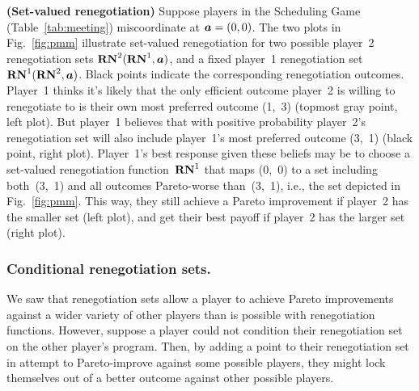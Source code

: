 \documentclass[sigconf]{aamas}
\theoremstyle{definition}
\begin{document}
\begin{exmp}
\label{ex:svr}
\textbf{(Set-valued renegotiation)}
Suppose players in 
the Scheduling Game (Table~\ref{tab:meeting})
miscoordinate at $\boldsymbol{a}= (0,0)$.
The two plots in Fig.~\ref{fig:pmm} 
illustrate set-valued renegotiation
for
two possible player~2 renegotiation
sets
$\mathbf{RN}^{2}(\mathbf{RN}^{1}, \boldsymbol{a})$,
and a fixed player~1
renegotiation
set
$\mathbf{RN}^{1}(\mathbf{RN}^{2}, \boldsymbol{a})$.
Black points indicate the corresponding renegotiation
outcomes.
Player~1 thinks it's likely that
the only efficient outcome
player~2 is willing to renegotiate to 
is their own most
preferred outcome (1,~3)
(topmost gray point, left
plot).
But player~1 believes
that
with positive probability
player~2's renegotiation set 
will also
include
player~1's most preferred outcome (3,~1)
(black point, right plot).
Player~1's best response given these
beliefs may be to choose a 
set-valued
renegotiation function~$\mathbf{RN}^{1}$
that
maps (0,~0)
to a set
including both~(3,~1) and all outcomes
Pareto-worse
than~(3,~1),
i.e., the set depicted in Fig.~\ref{fig:pmm}.
This way, they
still achieve a Pareto improvement
if
player~2 has the smaller set (left plot),
and get their best payoff
if player~2 has the larger set (right plot).
\end{exmp}

\subsubsection{Conditional renegotiation sets.}
We saw that renegotiation sets allow a player to achieve 
Pareto improvements against a wider variety
of other players than is possible with renegotiation functions.
However, suppose a player could not condition their
renegotiation set on the other player's program.
Then, by adding a point to their renegotiation set
in attempt to Pareto-improve against some possible players,
they might lock themselves out of a better outcome against other possible players.


  
\end{document}
